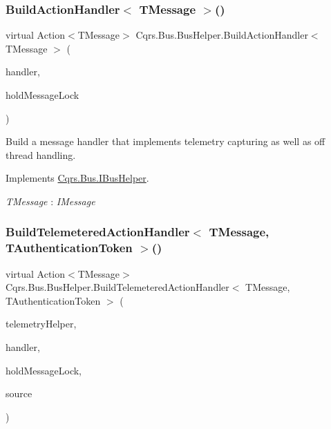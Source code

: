 \subsubsection{\texorpdfstring{Build\+Action\+Handler$<$ T\+Message $>$()}{BuildActionHandler< TMessage >()}}
{\footnotesize\ttfamily virtual Action$<$T\+Message$>$ Cqrs.\+Bus.\+Bus\+Helper.\+Build\+Action\+Handler$<$ T\+Message $>$ (\begin{DoxyParamCaption}\item[{Action$<$ T\+Message $>$}]{handler,  }\item[{bool}]{hold\+Message\+Lock }\end{DoxyParamCaption})\hspace{0.3cm}{\ttfamily [virtual]}}



Build a message handler that implements telemetry capturing as well as off thread handling. 



Implements \hyperlink{interfaceCqrs_1_1Bus_1_1IBusHelper_ac69a1e4722e2839c2c180b9a06a8646c_ac69a1e4722e2839c2c180b9a06a8646c}{Cqrs.\+Bus.\+I\+Bus\+Helper}.

\begin{Desc}
\item[Type Constraints]\begin{description}
\item[{\em T\+Message} : {\em I\+Message}]\end{description}
\end{Desc}
\mbox{\label{classCqrs_1_1Bus_1_1BusHelper_a7edd5b2ac0d46ce225e592f857f6d525_a7edd5b2ac0d46ce225e592f857f6d525}} 
\subsubsection{\texorpdfstring{Build\+Telemetered\+Action\+Handler$<$ T\+Message, T\+Authentication\+Token $>$()}{BuildTelemeteredActionHandler< TMessage, TAuthenticationToken >()}}
{\footnotesize\ttfamily virtual Action$<$T\+Message$>$ Cqrs.\+Bus.\+Bus\+Helper.\+Build\+Telemetered\+Action\+Handler$<$ T\+Message, T\+Authentication\+Token $>$ (\begin{DoxyParamCaption}\item[{I\+Telemetry\+Helper}]{telemetry\+Helper,  }\item[{Action$<$ T\+Message $>$}]{handler,  }\item[{bool}]{hold\+Message\+Lock,  }\item[{string}]{source }\end{DoxyParamCaption})\hspace{0.3cm}{\ttfamily [virtual]}}



